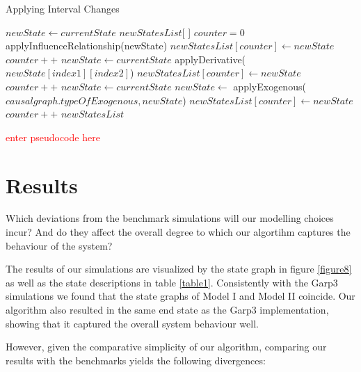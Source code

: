 \documentclass{article}
\begin{document}
\begin{algorithm}
	\caption{Applying Interval Changes}\label{intervalchanges}
	\begin{algorithmic}[1]
		\State $newState \gets currentState$
		\State $newStatesList$[ ]
		\State $counter=0$
		\State applyInfluenceRelationship(newState)
		\EndIf
		\State $newStatesList[counter] \gets newState$
		\State $counter++$
		\EndIf
		\EndFor
		\State $newState \gets currentState$
		\State applyDerivative($newState[index1][index2]$)
		\State $newStatesList[counter] \gets newState$
		\State $counter++$
		\EndIf
		\EndFor
		\EndFor
		\State $newState \gets currentState$
		\State $newState \gets$ applyExogenous($causalgraph.typeOfExogenous,newState$)
		\State $newStatesList[counter] \gets newState$
		\State $counter++$
		\EndIf
		\State \Return $newStatesList$
		\EndProcedure
	\end{algorithmic}
\end{algorithm}

\textcolor{red}{enter pseudocode here}

\section{Results}

Which deviations from the benchmark simulations will our modelling choices incur? And do they affect the overall degree to which our algortihm captures the behaviour of the system? 

The results of our simulations are visualized by the state graph in figure \ref{figure8} as well as the state descriptions in table \ref{table1}. Consistently with the Garp3 simulations we found that the state graphs of Model I and Model II coincide. Our algorithm also resulted in the same end state as the Garp3 implementation, showing that it captured the overall system behaviour well.

However, given the comparative simplicity of our algorithm, comparing our results with the benchmarks yields the following divergences:
\end{document}

